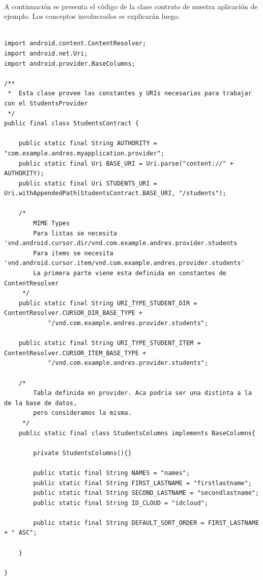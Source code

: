 \documentclass[10pt]{extarticle}
\begin{document}
\paragraph{}
A continuación se presenta el código de la clase contrato de nuestra aplicación de ejemplo. Los conceptos involucrados se explicarán luego.

\begin{lstlisting}

import android.content.ContentResolver;
import android.net.Uri;
import android.provider.BaseColumns;

/**
 *  Esta clase provee las constantes y URIs necesarias para trabajar con el StudentsProvider
 */
public final class StudentsContract {

    public static final String AUTHORITY = "com.example.andres.myapplication.provider";
    public static final Uri BASE_URI = Uri.parse("content://" + AUTHORITY);
    public static final Uri STUDENTS_URI = Uri.withAppendedPath(StudentsContract.BASE_URI, "/students");

    /*
        MIME Types
        Para listas se necesita  'vnd.android.cursor.dir/vnd.com.example.andres.provider.students
        Para items se necesita 'vnd.android.cursor.item/vnd.com.example.andres.provider.students'
        La primera parte viene esta definida en constantes de ContentResolver
     */
    public static final String URI_TYPE_STUDENT_DIR = ContentResolver.CURSOR_DIR_BASE_TYPE +
            "/vnd.com.example.andres.provider.students";

    public static final String URI_TYPE_STUDENT_ITEM = ContentResolver.CURSOR_ITEM_BASE_TYPE +
            "/vnd.com.example.andres.provider.students";

    /*
        Tabla definida en provider. Aca podria ser una distinta a la de la base de datos,
        pero consideramos la misma.
     */
    public static final class StudentsColumns implements BaseColumns{

        private StudentsColumns(){}

        public static final String NAMES = "names";
        public static final String FIRST_LASTNAME = "firstlastname";
        public static final String SECOND_LASTNAME = "secondlastname";
        public static final String ID_CLOUD = "idcloud";

        public static final String DEFAULT_SORT_ORDER = FIRST_LASTNAME + " ASC";

    }

}
     
\end{lstlisting}
\end{document}
